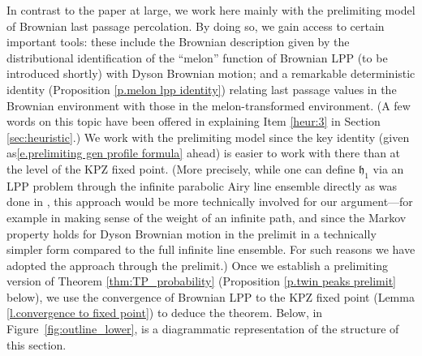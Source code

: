 \documentclass[oneside,final,11pt]{amsart}
\theoremstyle{definition}
\newcommand{\fh}{\mathfrak{h}}
\newcommand{\1}[1]{\mathbf{1}_{#1}}
\newcommand{\mh}[1]{\marginnote{\tiny{\color{blue}[MH: #1]}}}
\newcommand{\ah}[1]{\marginnote{\tiny{\color{green!65!black}[AH: #1]}}}
\numberwithin{equation}{section}
\begin{document}
In contrast to the paper at large, we work here mainly with the prelimiting model of Brownian last passage percolation. By doing so, we gain access to certain important tools: these include the Brownian description given by the distributional identification of the ``melon'' function of Brownian LPP (to be introduced shortly) with Dyson Brownian motion; and a remarkable deterministic identity (Proposition \ref{p.melon lpp identity}) relating last passage values in the Brownian environment with those in the melon-transformed environment. (A few words on this topic have been offered in explaining Item \ref{heur:3} in Section \ref{sec:heuristic}.) We work with the prelimiting model since the key identity (given as\eqref{e.prelimiting gen profile formula} ahead) is easier to work with there than at the level of the KPZ fixed point. (More precisely, while one can define $\fh_1$ via an LPP problem through the infinite parabolic Airy line ensemble directly as was done in \cite{sarkar2020brownian}, this approach would be more technically involved for our argument---for example in making sense of the weight of an infinite path, and since the Markov property holds for Dyson Brownian motion in the prelimit in a technically simpler form compared to the full infinite line ensemble. For such reasons we have adopted the approach through the prelimit.) Once we establish a prelimiting version of Theorem \ref{thm:TP_probability} (Proposition \ref{p.twin peaks prelimit} below), we use the convergence of Brownian LPP to the KPZ fixed point (Lemma \ref{l.convergence to fixed point}) to deduce the theorem.
Below, in Figure~\ref{fig:outline_lower}, is a diagrammatic representation of the structure of this section.
\end{document}
